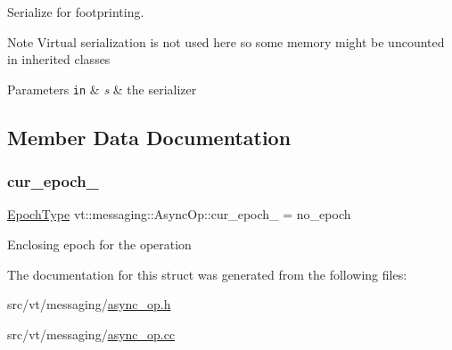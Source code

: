 Serialize for footprinting. 

\begin{DoxyNote}{Note}
Virtual serialization is not used here so some memory might be uncounted in inherited classes
\end{DoxyNote}

\begin{DoxyParams}[1]{Parameters}
\mbox{\tt in}  & {\em s} & the serializer \\
\hline
\end{DoxyParams}


\subsection{Member Data Documentation}
\mbox{\label{structvt_1_1messaging_1_1_async_op_a19b64071b5b952c062139c9d1b1ce15b}} 
\subsubsection{\texorpdfstring{cur\+\_\+epoch\+\_\+}{cur\_epoch\_}}
{\footnotesize\ttfamily \hyperlink{namespacevt_a985a5adf291c34a3ca263b3378388236}{Epoch\+Type} vt\+::messaging\+::\+Async\+Op\+::cur\+\_\+epoch\+\_\+ = no\+\_\+epoch\hspace{0.3cm}{\ttfamily [protected]}}

Enclosing epoch for the operation 

The documentation for this struct was generated from the following files\+:\begin{DoxyCompactItemize}
\item 
src/vt/messaging/\hyperlink{async__op_8h}{async\+\_\+op.\+h}\item 
src/vt/messaging/\hyperlink{async__op_8cc}{async\+\_\+op.\+cc}\end{DoxyCompactItemize}
